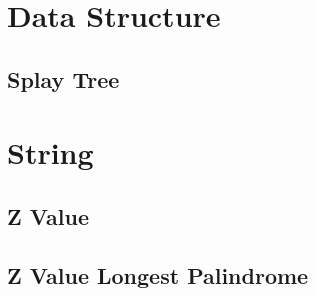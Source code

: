 \documentclass[10pt,twocolumn,oneside]{article}
\begin{document}
    \section{Data Structure}
    \subsection{Splay Tree}
    
    \newpage

    \section{String}
    \subsection{Z Value}
    
    \subsection{Z Value Longest Palindrome}
    
    \newpage



    
\end{document}
